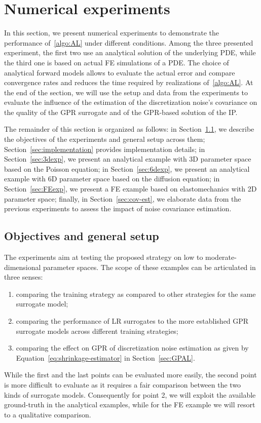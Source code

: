 \section{Numerical experiments}\label{sec:exp}

In this section, we present numerical experiments to demonstrate the performance of~\ref{algo:AL} under different conditions. 
Among the three presented experiment, the first two use an analytical solution of the underlying PDE, while the third one is based on actual FE simulations of a PDE.
The choice of analytical forward models allows to evaluate the actual error and compare convergence rates and reduces the time required by realizations of~\ref{algo:AL}. 
At the end of the section, we will use the setup and data from the experiments to evaluate the influence of the estimation of the discretization noise's covariance on the quality of the GPR surrogate and of the GPR-based solution of the IP.  \medskip 

The remainder of this section is organized as follows: in Section~\ref{sec:setup}, we describe the objectives of the experiments and general setup across them; Section~\ref{sec:implementation} provides implementation details; in Section~\ref{sec:3dexp}, we present an analytical example with 3D parameter space based on the Poisson equation; in Section~\ref{sec:6dexp}, we present an analytical example with 6D parameter space based on the diffusion equation; in Section~\ref{sec:FEexp}, we present a FE example based on elastomechanics with 2D parameter space; finally, in Section~\ref{sec:cov-est}, we elaborate data from the previous experiments to assess the impact of noise covariance estimation.

\subsection{Objectives and general setup}\label{sec:setup}

The experiments aim at testing the proposed strategy on low to moderate-dimensional parameter spaces.
The scope of these examples can be articulated in three senses:
\begin{enumerate}
    \item comparing the training strategy as compared to other strategies for the same surrogate model;
    \item comparing the performance of LR surrogates to the more established GPR surrogate models across different training strategies;
    \item comparing the effect on GPR of discretization noise estimation as given by Equation~\eqref{eq:shrinkage-estimator} in Section~\ref{sec:GPAL}.
\end{enumerate}
While the first and the last points can be evaluated more easily, the second point is more difficult to evaluate as it requires a fair comparison between the two kinds of surrogate models.
Consequently for point 2, we will exploit the available ground-truth in the analytical examples, while for the FE example we will resort to a qualitative comparison.

